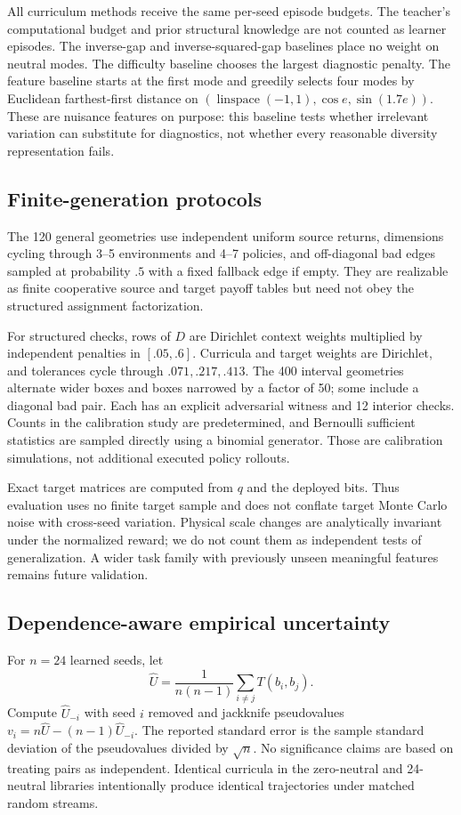 \documentclass[11pt]{article}
\theoremstyle{definition}\newtheorem{definition}[theorem]{Definition}
\newcommand{\1}{\mathbf{1}}
\begin{document}
All curriculum methods receive the same per-seed episode budgets. The teacher's computational budget and prior structural knowledge are not counted as learner episodes. The inverse-gap and inverse-squared-gap baselines place no weight on neutral modes. The difficulty baseline chooses the largest diagnostic penalty. The feature baseline starts at the first mode and greedily selects four modes by Euclidean farthest-first distance on $(\operatorname{linspace}(-1,1),\cos e,\sin(1.7e))$. These are nuisance features on purpose: this baseline tests whether irrelevant variation can substitute for diagnostics, not whether every reasonable diversity representation fails.

\subsection{Finite-generation protocols}
The 120 general geometries use independent uniform source returns, dimensions cycling through 3--5 environments and 4--7 policies, and off-diagonal bad edges sampled at probability $.5$ with a fixed fallback edge if empty. They are realizable as finite cooperative source and target payoff tables but need not obey the structured assignment factorization.

For structured checks, rows of $D$ are Dirichlet context weights multiplied by independent penalties in $[.05,.6]$. Curricula and target weights are Dirichlet, and tolerances cycle through $.071,.217,.413$. The 400 interval geometries alternate wider boxes and boxes narrowed by a factor of 50; some include a diagonal bad pair. Each has an explicit adversarial witness and 12 interior checks. Counts in the calibration study are predetermined, and Bernoulli sufficient statistics are sampled directly using a binomial generator. Those are calibration simulations, not additional executed policy rollouts.

Exact target matrices are computed from $q$ and the deployed bits. Thus evaluation uses no finite target sample and does not conflate target Monte Carlo noise with cross-seed variation. Physical scale changes are analytically invariant under the normalized reward; we do not count them as independent tests of generalization. A wider task family with previously unseen meaningful features remains future validation.

\subsection{Dependence-aware empirical uncertainty}
For $n=24$ learned seeds, let
\begin{equation*}
 \widehat U=\frac{1}{n(n-1)}\sum_{i\ne j}T(b_i,b_j).
\end{equation*}
Compute $\widehat U_{-i}$ with seed $i$ removed and jackknife pseudovalues $v_i=n\widehat U-(n-1)\widehat U_{-i}$. The reported standard error is the sample standard deviation of the pseudovalues divided by $\sqrt n$. No significance claims are based on treating pairs as independent. Identical curricula in the zero-neutral and 24-neutral libraries intentionally produce identical trajectories under matched random streams.
\end{document}
